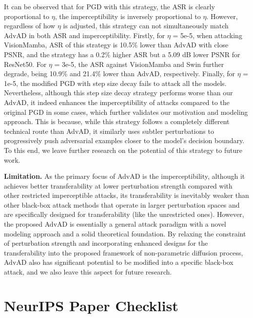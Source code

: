 \documentclass{article}
\begin{document}
It can be observed that for PGD with this strategy, the ASR is clearly proportional to $\eta$, the imperceptibility is inversely proportional to $\eta$. However, regardless of how $\eta$ is adjusted, this strategy can not simultaneously match AdvAD in both ASR and imperceptibility. Firstly, for $\eta$ = 5e-5, when attacking VisionMamba, ASR of this strategy is 10.5$\%$ lower than AdvAD with close PSNR, and the strategy has a 0.2$\%$ higher ASR but a 5.09 dB lower PSNR for ResNet50. For $\eta$ = 3e-5, the ASR against VisionMamba and Swin further degrade, being 10.9$\%$ and 21.4$\%$ lower than AdvAD, respectively. Finally, for $\eta$ = 1e-5, the modified PGD with step size decay fails to attack all the models. Nevertheless, although this step size decay strategy performs worse than our AdvAD, it indeed enhances the imperceptibility of attacks compared to the original PGD in some cases, which further validates our motivation and modeling approach. This is because, while this strategy follows a completely different technical route than AdvAD, it similarly uses subtler perturbations to progressively push adversarial examples closer to the model's decision boundary. To this end, we leave further research on the potential of this strategy to future work.


\textbf{Limitation.} As the primary focus of AdvAD is the imperceptibility, although it achieves better transferability at lower perturbation strength compared with other restricted imperceptible attacks, its transferability is inevitably weaker than other black-box attack methods that operate in larger perturbation spaces and are specifically designed for transferability (like the unrestricted ones). However, the proposed AdvAD is essentially a general attack paradigm with a novel modeling approach and a solid theoretical foundation. By relaxing the constraint of perturbation strength and incorporating enhanced designs for the transferability into the proposed framework of non-parametric diffusion process, AdvAD also has significant potential to be modified into a specific black-box attack, and we also leave this aspect for future research.

\newpage
\section*{NeurIPS Paper Checklist}
\end{document}
